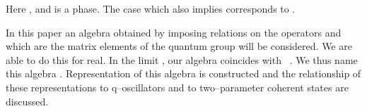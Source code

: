 \documentclass[a4paper,12pt]{article}
\numberwithin{equation}{section}
\begin{document}
Here \coordHE{}, \coordHE{}  and
 \myHighlight{$\theta$}\coordHE{} is a phase. The case \coordHE{} which also implies
 \coordHE{} corresponds to \coordHE{}.

In this paper an algebra obtained by imposing \myHighlight{$\ast$}\coordHE{} relations on the operators \coordHE{} and \coordHE{} which are the matrix elements
 of the quantum group \coordHE{} will be considered.
We are able to do this for \coordHE{} real. In the limit \coordHE{}, our algebra coincides with \coordHE{}~\cite{Jag}.
We thus name this algebra \coordHE{}. Representation of this algebra is constructed and the relationship of
 these representations to q--oscillators and to two--parameter coherent states are discussed.
\end{document}
